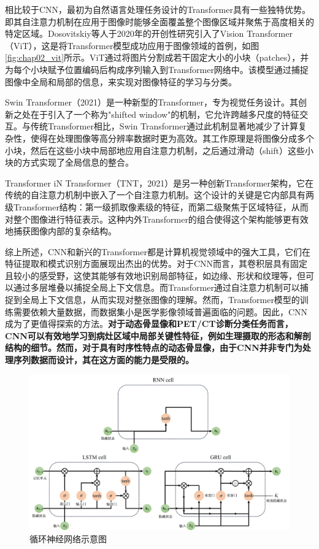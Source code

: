 相比较于CNN，最初为自然语言处理任务设计的Transformer具有一些独特优势。即其自注意力机制在应用于图像时能够全面覆盖整个图像区域并聚焦于高度相关的特定区域。Dosovitskiy等人\cite{dosovitskiy2020image}于2020年的开创性研究引入了Vision Transformer（ViT），这是将Transformer模型成功应用于图像领域的首例，如图\ref{fig:chap02_vit}所示。ViT通过将图片分割成若干固定大小的小块（patches），并为每个小块赋予位置编码后构成序列输入到Transformer网络中。该模型通过捕捉图像中全局和局部的信息，来实现对图像特征的学习与分类。

Swin Transformer\cite{liu2021swin}（2021）是一种新型的Transformer，专为视觉任务设计。其创新之处在于引入了一个称为"shifted window"的机制，它允许跨越多尺度的特征交互。与传统Transformer相比，Swin Transformer通过此机制显著地减少了计算复杂性，使得在处理图像等高分辨率数据时更为高效。其工作原理是将图像分成多个小块，然后在这些小块中局部地应用自注意力机制，之后通过滑动（shift）这些小块的方式实现了全局信息的整合。

Transformer iN Transformer\cite{han2021transformer}（TNT，2021）是另一种创新Transformer架构，它在传统的自注意力机制中嵌入了一个自注意力机制。这个设计的关键是它内部具有两级Transformer结构：第一级抓取像素级的特征，而第二级聚焦于区域特征，从而对整个图像进行特征表示。这种内外Transformer的组合使得这个架构能够更有效地捕获图像内部的复杂结构。

综上所述，CNN和新兴的Transformer都是计算机视觉领域中的强大工具，它们在特征提取和模式识别方面展现出杰出的优势。对于CNN而言，其卷积层具有固定且较小的感受野，这使其能够有效地识别局部特征，如边缘、形状和纹理等，但可以通过多层堆叠以捕捉全局上下文信息。而Transformer通过自注意力机制可以捕捉到全局上下文信息，从而实现对整张图像的理解。然而，Transformer模型的训练需要依赖大量数据，而数据集小是医学影像领域普遍面临的问题。因此，CNN成为了更值得探索的方法。\textbf{对于动态骨显像和PET/CT诊断分类任务而言，CNN可以有效地学习到病灶区域中局部关键性特征，例如生理摄取的形态和解剖结构的细节。然而，对于具有时序性特点的动态骨显像，由于CNN并非专门为处理序列数据而设计，其在这方面的能力是受限的。}

\begin{figure}[htbp]
  \centering
  \includegraphics[width=\textwidth]{figures/chap02_rnn.jpg}
  \caption{循环神经网络示意图}
  \label{fig:chap02_rnn}
\end{figure}


